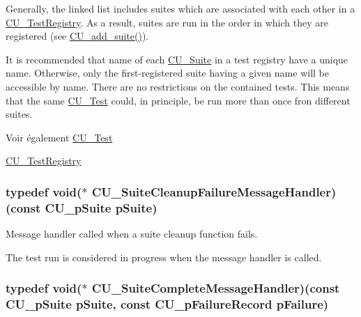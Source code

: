 Generally, the linked list includes suites which are associated with each other in a \hyperlink{structCU__TestRegistry}{C\-U\-\_\-\-Test\-Registry}. As a result, suites are run in the order in which they are registered (see \hyperlink{group__Framework_ga94b8f1bbbd93b154a60bb1d43391b48a}{C\-U\-\_\-add\-\_\-suite()}).\par
\par


It is recommended that name of each \hyperlink{structCU__Suite}{C\-U\-\_\-\-Suite} in a test registry have a unique name. Otherwise, only the first-\/registered suite having a given name will be accessible by name. There are no restrictions on the contained tests. This means that the same \hyperlink{structCU__Test}{C\-U\-\_\-\-Test} could, in principle, be run more than once fron different suites.

\begin{DoxySeeAlso}{Voir également}
\hyperlink{structCU__Test}{C\-U\-\_\-\-Test} 

\hyperlink{structCU__TestRegistry}{C\-U\-\_\-\-Test\-Registry} 
\end{DoxySeeAlso}
\hypertarget{group__Framework_ga67a720062975e6b7f97df16a1e8e10ce}{
\subsubsection[{C\-U\-\_\-\-Suite\-Cleanup\-Failure\-Message\-Handler}]{\setlength{\rightskip}{0pt plus 5cm}typedef void($\ast$ C\-U\-\_\-\-Suite\-Cleanup\-Failure\-Message\-Handler)(const {\bf C\-U\-\_\-p\-Suite} p\-Suite)}}\label{group__Framework_ga67a720062975e6b7f97df16a1e8e10ce}


Message handler called when a suite cleanup function fails. 

The test run is considered in progress when the message handler is called. \hypertarget{group__Framework_gafe19dbdf8b13029d10e9463bc698be58}{
\subsubsection[{C\-U\-\_\-\-Suite\-Complete\-Message\-Handler}]{\setlength{\rightskip}{0pt plus 5cm}typedef void($\ast$ C\-U\-\_\-\-Suite\-Complete\-Message\-Handler)(const {\bf C\-U\-\_\-p\-Suite} p\-Suite, const {\bf C\-U\-\_\-p\-Failure\-Record} p\-Failure)}}\label{group__Framework_gafe19dbdf8b13029d10e9463bc698be58}


